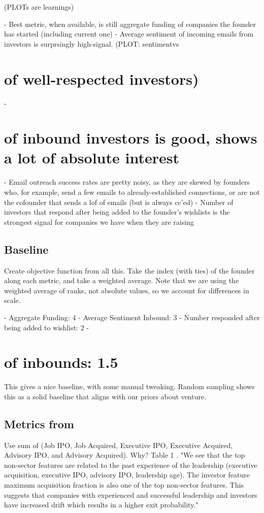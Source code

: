 (PLOTs are learnings)

- Best metric, when available, is still aggregate funding of companies the founder has started (including current one)
- Average sentiment of incoming emails from investors is surprsingly high-signal. (PLOT: sentimentvs \section{of well-respected investors)}
- \section{of inbound investors is good, shows a lot of absolute interest}
- Email outreach success rates are pretty noisy, as they  are skewed by founders who, for example, send a few emails to already-established connections, or are not the cofounder that sends a lof of emails (but is always cc'ed)
- Number of investors that respond after being added to the founder's wishlists is the strongest signal for companies we have when they are raising

\subsection{Baseline}

Create objective function from all this. Take the index (with ties) of the founder along each metric, and take a weighted average. Note that we are using the weighted average of ranks, not absolute values, so we account for differences in scale.

- Aggregate Funding: 4
- Average Sentiment Inbound: 3
- Number responded after being added to wishlist: 2
- \section{of inbounds: 1.5}

This gives a nice baseline, with some manual tweaking. Random sampling shows this as a solid baseline that aligns with our priors about venture.

\subsection{Metrics from \cite{2017arXiv170604229H}}

Use sum of (Job IPO, Job Acquired, Executive IPO, Executive Acquired, Advisory IPO, and Advisory Acquired). Why? Table 1 \cite{2017arXiv170604229H}. "We see that the top non-sector features are related to the past experience of the leadership (executive acquisition, executive IPO, advisory IPO, leadership age). The investor feature maximum acquisition fraction is also one of the top non-sector features. This suggests that companies with experienced and successful leadership and investors have increased drift which results in a higher exit probability."

